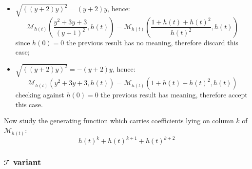 \documentclass[11pt,a4paper]{article} %
\begin{document}
    \begin{itemize}
        \item $\sqrt{\left(\left(y + 2\right) y\right)^{2}}=\left(y + 2\right) y$, hence:
            \begin{displaymath} 
                \mathcal{M}_{h(t)}\left(\frac{y^{2} + 3y + 3}{{\left(y + 1\right)}^{2}} , h(t) \right) = 
                    \mathcal{M}_{h(t)}\left( \frac{1+h(t)+h(t)^2}{h(t)^2}, h(t) \right) 
            \end{displaymath} 
            since $h(0)=0$ the previous result has no meaning, therefore discard this case;
        \item $\sqrt{\left(\left(y + 2\right) y\right)^{2}}=-\left(y + 2\right) y$, hence:
            \begin{displaymath} 
                \mathcal{M}_{h(t)}\left(y^{2} + 3y + 3 , h(t) \right) = 
                    \mathcal{M}_{h(t)}\left( 1+h(t)+h(t)^2, h(t) \right) 
            \end{displaymath} 
            checking against $h(0)=0$ the previous result has meaning, therefore accept this case.
    \end{itemize}
    Now study the generating function which carries coefficients lying on column $k$
    of $\mathcal{M}_{h(t)}$:
    \begin{displaymath} 
        h(t)^{k}+h(t)^{k+1}+h(t)^{k+2}
    \end{displaymath} 


    \subsubsection{$\mathcal{T}$ variant}
\end{document}
